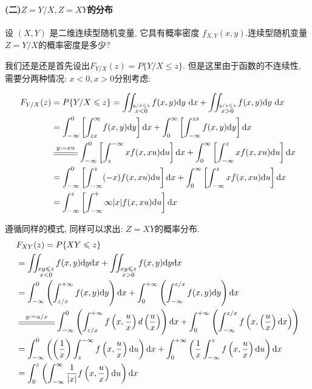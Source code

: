 \paragraph{(二)$Z=Y/X,Z=XY$的分布}

设 $(X, Y)$ 是二维连续型随机变量, 它具有概率密度 $f_{X,Y}(x, y)$.连续型随机变量$Z=Y/X$的概率密度是多少?

我们还是还是首先设出$F_{Y/X}(z)=P\{Y/X\leq z\}$. 但是这里由于函数的不连续性, 需要分两种情况: $x<0, x>0$分别考虑:

$$
\begin{aligned}
F_{Y / X}(z) & =P\{Y / X \leqslant z\}=\iint_{\stackrel{y / x \leqslant z}{x<0}} f(x, y) \mathrm{d} y \mathrm{~d} x+\iint_{\stackrel{y / x \leqslant z}{x>0}} f(x, y) \mathrm{d} y \mathrm{~d} x \\
& =\int_{-\infty}^0\left[\int_{z x}^{\infty} f(x, y) \mathrm{d} y\right] \mathrm{d} x+\int_0^{\infty}\left[\int_{-\infty}^{z x} f(x, y) \mathrm{d} y\right] \mathrm{d} x \\
& \varsub{y:=xu}{1cm} \int_{-\infty}^0\left[\int_z^{-\infty} x f(x, x u) \mathrm{d} u\right] \mathrm{d} x+\int_0^{\infty}\left[\int_{-\infty}^z x f(x, x u) \mathrm{d} u\right] \mathrm{d} x \\
& =\int_{-\infty}^0\left[\int_{-\infty}^z(-x) f(x, x u) \mathrm{d} u\right] \mathrm{d} x+\int_0^{\infty}\left[\int_{-\infty}^z x f(x, x u) \mathrm{d} u\right] \mathrm{d} x \\
& =\int_{-\infty}^z\left[\int_{-\infty}^+\infty|x| f(x, x u) \mathrm{d} u\right] \mathrm{d} x
\end{aligned}
$$

遵循同样的模式, 同样可以求出: $Z=XY$的概率分布. 
$$
\begin{aligned} & F_{XY}(z)=P\{XY\leqslant z\}\\
 & =\iint_{\substack{xy\leqslant z\\
 x<0}}f(x,y)\dd y\dd x+\iint_{\substack{xy\leqslant z\\
 x>0}}f(x,y)\dd y\dd x\\
 & =\int_{-\infty}^{0}\left(\int_{z/x}^{+\infty}f(x,y)\dd y\right)\dd x+\int_{0}^{+\infty}\left(\int_{-\infty}^{z/x}f(x,y)\dd y\right)\dd x\\
 & \varsub{y:=u/x}{1.5cm}\int_{-\infty}^{0}\left(\int_{z/x}^{+\infty}f\left(x,\frac{u}{x}\right)d\left(\frac{u}{x}\right)\right)\dd x+\int_{0}^{+\infty}\left(\int_{-\infty}^{z/x}f\left(x,\left(\frac{u}{x}\right)\dd x\right)\right)\\
 & =\int_{-\infty}^{0}\left(\left(\frac{1}{x}\right)\int_{z}^{-\infty}f\left(x,\frac{u}{x}\right)\dd u\right)\dd x+\int_{0}^{+\infty}\left(\frac{1}{x}\int_{-\infty}^{z}f\left(x,\frac{u}{x}\right)\dd u\right)\dd x\\
 & =\int_{0}^{z}\left(\int_{-\infty}^{\infty}\frac{1}{|x|}f\left(x,\frac{u}{x}\right)\dd u\right)\dd x
\end{aligned}
$$

